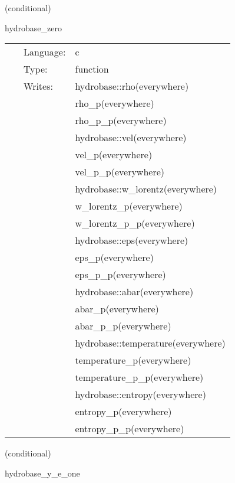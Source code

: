 \vspace{5mm}

   (conditional) 

\hspace{5mm} hydrobase\_zero 

\hspace{5mm}{\it set up vacuum hydro initial data } 


\hspace{5mm}

 \begin{tabular*}{160mm}{cll} 
~ & Language:  & c \\ 
~ & Type:  & function \\ 
~ & Writes:  & hydrobase::rho(everywhere) \\ 
~& ~ &rho\_p(everywhere)\\ 
~& ~ &rho\_p\_p(everywhere)\\ 
~& ~ &hydrobase::vel(everywhere)\\ 
~& ~ &vel\_p(everywhere)\\ 
~& ~ &vel\_p\_p(everywhere)\\ 
~& ~ &hydrobase::w\_lorentz(everywhere)\\ 
~& ~ &w\_lorentz\_p(everywhere)\\ 
~& ~ &w\_lorentz\_p\_p(everywhere)\\ 
~& ~ &hydrobase::eps(everywhere)\\ 
~& ~ &eps\_p(everywhere)\\ 
~& ~ &eps\_p\_p(everywhere)\\ 
~& ~ &hydrobase::abar(everywhere)\\ 
~& ~ &abar\_p(everywhere)\\ 
~& ~ &abar\_p\_p(everywhere)\\ 
~& ~ &hydrobase::temperature(everywhere)\\ 
~& ~ &temperature\_p(everywhere)\\ 
~& ~ &temperature\_p\_p(everywhere)\\ 
~& ~ &hydrobase::entropy(everywhere)\\ 
~& ~ &entropy\_p(everywhere)\\ 
~& ~ &entropy\_p\_p(everywhere)\\ 
\end{tabular*} 


\vspace{5mm}

   (conditional) 

\hspace{5mm} hydrobase\_y\_e\_one 

